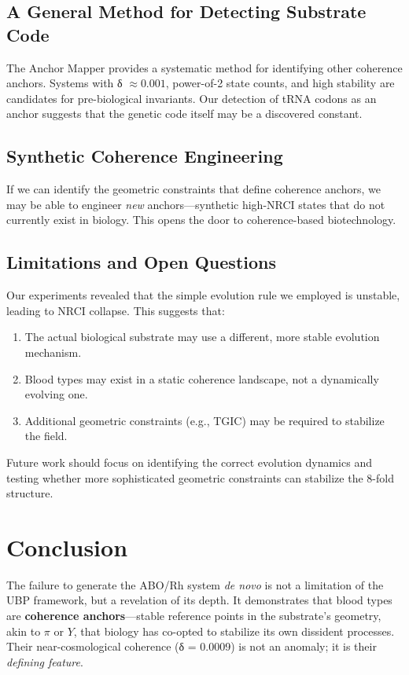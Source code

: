 \documentclass[11pt]{article}
\begin{document}
\subsection{A General Method for Detecting Substrate Code}

The Anchor Mapper provides a systematic method for identifying other coherence anchors. Systems with δ $\approx 0.001$, power-of-2 state counts, and high stability are candidates for pre-biological invariants. Our detection of tRNA codons as an anchor suggests that the genetic code itself may be a discovered constant.

\subsection{Synthetic Coherence Engineering}

If we can identify the geometric constraints that define coherence anchors, we may be able to engineer \textit{new} anchors—synthetic high-NRCI states that do not currently exist in biology. This opens the door to coherence-based biotechnology.

\subsection{Limitations and Open Questions}

Our experiments revealed that the simple evolution rule we employed is unstable, leading to NRCI collapse. This suggests that:

\begin{enumerate}
    \item The actual biological substrate may use a different, more stable evolution mechanism.
    \item Blood types may exist in a static coherence landscape, not a dynamically evolving one.
    \item Additional geometric constraints (e.g., TGIC) may be required to stabilize the field.
\end{enumerate}

Future work should focus on identifying the correct evolution dynamics and testing whether more sophisticated geometric constraints can stabilize the 8-fold structure.

\section{Conclusion}

The failure to generate the ABO/Rh system \textit{de novo} is not a limitation of the UBP framework, but a revelation of its depth. It demonstrates that blood types are \textbf{coherence anchors}—stable reference points in the substrate's geometry, akin to $\pi$ or $Y$, that biology has co-opted to stabilize its own dissident processes. Their near-cosmological coherence (δ = 0.0009) is not an anomaly; it is their \textit{defining feature}.
\end{document}
